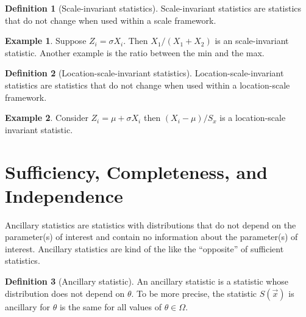 \documentclass{book}
\theoremstyle{definition}
\newtheorem{defn}{Definition}[section]
\newtheorem{exmp}{Example}[section]
\begin{document}
\begin{defn}[Scale-invariant statistics]
	Scale-invariant statistics are statistics that do not change when used within a scale  framework. 
\end{defn}

\begin{exmp}
	Suppose $Z_i = \sigma X_i$. Then $X_1/(X_1 + X_2)$ is an scale-invariant statistic. Another example is the ratio between the min and the max.
\end{exmp}


\begin{defn}[Location-scale-invariant statistics]
	Location-scale-invariant statistics are statistics that do not change when used within a location-scale  framework. 
\end{defn}


\begin{exmp}
	Consider $Z_i = \mu + \sigma X_i$ then $(X_i - \mu)/S_x$ is a location-scale invariant statistic. 
\end{exmp}
































\section{Sufficiency, Completeness, and Independence}


Ancillary statistics are statistics with distributions that do not depend on the parameter(s) of interest and contain no information about the parameter(s) of interest. Ancillary statistics are kind of the like the ``opposite'' of sufficient statistics.



\begin{defn}[Ancillary statistic]
An ancillary statistic is a statistic whose distribution does not depend on $\theta$. To be more precise, the statistic $S(\vec{x})$ is ancillary for $\theta$ is the same for all values of $\theta \in \Omega$.
\end{defn}
\end{document}
